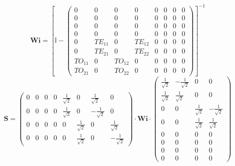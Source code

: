 \[ \mathbf{Wi} =  \left[ \mathbb{I}  - \left(\begin{array}{cccccccc} 0
& 0 & 0 & 0 & 0 & 0 & 0 & 0 \\ 0 & 0 & 0 & 0 & 0 & 0 & 0 & 0 \\ 0 & 0
& 0 & 0 & 0 & 0 & 0 & 0 \\ 0 & 0 & 0 & 0 & 0 & 0 & 0 & 0 \\ 0 &
TE_{11} & 0 & TE_{12} & 0 & 0 & 0 & 0 \\ 0 & TE_{21} & 0 & TE_{22} & 0
& 0 & 0 & 0 \\ TO_{11} & 0 & TO_{12} & 0 & 0 & 0 & 0 & 0 \\ TO_{21} &
0 & TO_{22} & 0 & 0 & 0 & 0 & 0 \end{array}\right) \right]^{-1}  \]
\[ \mathbf{S} = \left(\begin{array}{cccccccc} 0 & 0 & 0 & 0 &
\frac{1}{\sqrt{2}} & 0 & \frac{1}{\sqrt{2}} & 0 \\ 0 & 0 & 0 & 0 &
\frac{1}{\sqrt{2}} & 0 & -\frac{1}{\sqrt{2}} & 0 \\ 0 & 0 & 0 & 0 & 0
& \frac{1}{\sqrt{2}} & 0 & \frac{1}{\sqrt{2}} \\ 0 & 0 & 0 & 0 & 0 &
\frac{1}{\sqrt{2}} & 0 & -\frac{1}{\sqrt{2}} \end{array}\right) \cdot
\mathbf{Wi} \cdot\left(\begin{array}{cccc} \frac{1}{\sqrt{2}} &
-\frac{1}{\sqrt{2}} & 0 & 0 \\ \frac{1}{\sqrt{2}} & \frac{1}{\sqrt{2}}
& 0 & 0 \\ 0 & 0 & \frac{1}{\sqrt{2}} & -\frac{1}{\sqrt{2}} \\ 0 & 0 &
\frac{1}{\sqrt{2}} & \frac{1}{\sqrt{2}} \\ 0 & 0 & 0 & 0 \\ 0 & 0 & 0
& 0 \\ 0 & 0 & 0 & 0 \\ 0 & 0 & 0 & 0 \end{array}\right) \]
